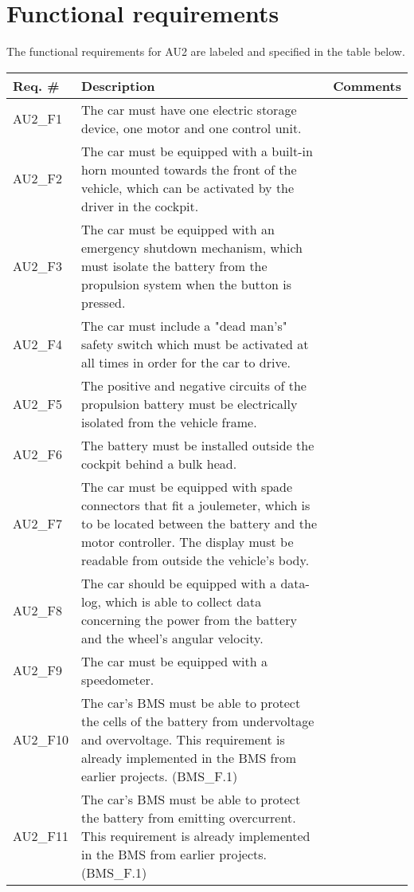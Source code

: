 \section{Functional requirements}
The functional requirements for AU2 are labeled and specified in the table below.

\begin{longtable}{|p{2 cm}|p{7 cm}|p{4 cm}|}
		\hline
		\textbf{Req. \#} & \textbf{Description} & \textbf{Comments} \\\hline
		AU2\_F1		& The car must have one electric storage device, one motor and one control unit. &   \\\hline
		AU2\_F2		& The car must be equipped with a built-in horn mounted towards the front of the vehicle, which can be activated by the driver in the cockpit. &   \\\hline
		AU2\_F3		& The car must be equipped with an emergency shutdown mechanism, which must isolate the battery from the propulsion system when the button is pressed. &   \\\hline
		AU2\_F4		& The car must include a "dead man's" safety switch which must be activated at all times in order for the car to drive. &   \\\hline
		AU2\_F5	& The positive and negative circuits of the propulsion battery  must be electrically isolated from the vehicle frame. &   \\\hline
		AU2\_F6		& The battery must be installed outside the cockpit behind a bulk head. &   \\\hline
		AU2\_F7	& The car must be equipped with spade connectors that fit a joulemeter, which is to be located between the battery and the motor controller. The display must be readable from outside the vehicle's body. &   \\\hline
		AU2\_F8	& The car should be equipped with a data-log, which is able to collect data concerning the power from the battery and the wheel's angular velocity. &   \\\hline
		AU2\_F9	& The car must be equipped with a speedometer. &   \\\hline
		AU2\_F10	& The car's BMS must be able to protect the cells of the battery from undervoltage and overvoltage. This requirement is already implemented in the BMS from earlier projects. (BMS\_F.1) \fxnote{reference to 2013BMS Documentation} &   \\\hline
		AU2\_F11	& The car's BMS must be able to protect the battery from emitting overcurrent. This requirement is already implemented in the BMS from earlier projects. (BMS\_F.1) \fxnote{reference to 2013BMS Documentation} &   \\\hline

\end{longtable}
